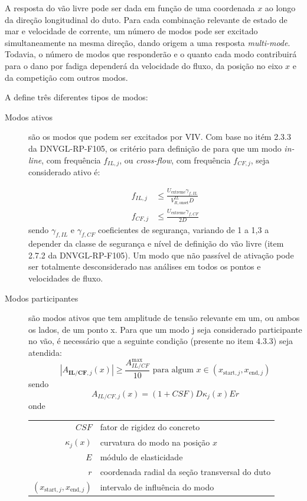 A resposta do vão livre pode ser dada em função de uma coordenada $x$ ao longo da direção longitudinal do duto.
Para cada combinação relevante de estado de mar e velocidade de corrente, um número de modos pode ser excitado simultaneamente na mesma direção, dando origem a uma resposta \textit{multi-mode}.
Todavia, o número de modos que responderão e o quanto cada modo contribuirá para o dano por fadiga dependerá da velocidade do fluxo, da posição no eixo $x$ e da competição com outros modos.

A  define três diferentes tipos de modos:
\begin{description}
	\item[Modos ativos] são os modos que podem ser excitados por VIV. Com base no itém 2.3.3 da DNVGL-RP-F105, os critério para definição de para que um modo \textit{in-line}, com frequência $f_{IL,j}$, ou \textit{cross-flow}, com frequência $f_{CF,j}$, seja considerado ativo é:
    
    \begin{equation}
        \begin{aligned}
        f_{I L, j} & \leq \frac{U_{\text{extreme}} \gamma_{f,IL}}{V_{R,\text{onset}}^{IL} D} \\
        f_{C F, j} & \leq \frac{U_{\text{extreme}} \gamma_{f,CF}}{2D}
        \end{aligned}
    \end{equation}
    sendo $\gamma_{f,IL}$ e $\gamma_{f,CF}$ coeficientes de segurança, variando de 1 a 1,3 a depender da classe de segurança e nível de
    definição do vão livre (item 2.7.2 da DNVGL-RP-F105).
    Um modo que não passível de ativação pode ser totalmente desconsiderado nas análises em todos os pontos e velocidades de fluxo.
	
    \item[Modos participantes] são modos ativos que tem amplitude de tensão relevante em um, ou ambos os lados, de um ponto x. Para que um modo j seja considerado participante no vão, é necessário que a seguinte condição (presente no item 4.3.3) seja atendida:
    $$
    \left|A_{\textbf{IL/CF}, j}(x)\right| \geq \frac{A_{IL/CF}^{\max}}{10} \text{ para algum } x \in (x_{\text{start},j}, x_{\text{end}, j})
    $$
    sendo
    $$
    A_{IL/CF, j}(x) = (1+CSF) D \kappa_{j}(x) E r
    $$
    onde
    
    \begin{tabular}{rl}
        $\mathit{CSF}$                            & fator de rigidez do concreto\\
        $\kappa_{j}(x)$                           & curvatura do modo na posição $x$\\
        $E$                                       & módulo de elasticidade\\
        $r$                                       & coordenada radial da seção transversal do duto\\
        $(x_{\text{start},j}, x_{\text{end}, j})$ & intervalo de influência do modo
    \end{tabular}


\end{description}
